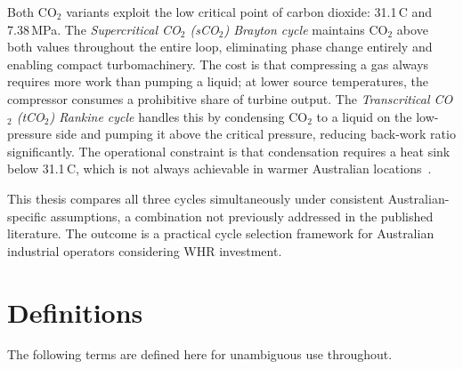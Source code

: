 \documentclass[12pt,a4paper]{report}
\begin{document}
Both CO$_2$ variants exploit the low critical point of carbon dioxide:
31.1\,\textdegree C and 7.38\,MPa. The \textit{Supercritical CO$_2$ (sCO$_2$)
Brayton cycle} maintains CO$_2$ above both values throughout the entire loop,
eliminating phase change entirely and enabling compact turbomachinery. The
cost is that compressing a gas always requires more work than pumping a
liquid; at lower source temperatures, the compressor consumes a prohibitive
share of turbine output. The \textit{Transcritical CO$_2$ (tCO$_2$) Rankine
cycle} handles this by condensing CO$_2$ to a liquid on the low-pressure side
and pumping it above the critical pressure, reducing back-work ratio
significantly. The operational constraint is that condensation requires a heat sink below 31.1\,\textdegree C, which is not always achievable in warmer Australian locations~\cite{Jiang2023,Lee2023}.

This thesis compares all three cycles simultaneously under consistent
Australian-specific assumptions, a combination not previously addressed in the
published literature. The outcome is a practical cycle selection framework for
Australian industrial operators considering WHR investment.

\section{Definitions}
\label{sec:definitions}

The following terms are defined here for unambiguous use throughout.
\end{document}

